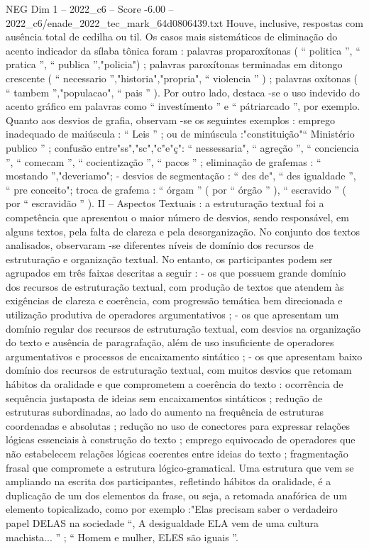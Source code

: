 \begin{textsample}{NEG Dim 1 – 2022\_c6 – Score -6.00 – 2022\_c6/enade\_2022\_tec\_mark\_64d0806439.txt}
Houve, inclusive, respostas com ausência total de cedilha ou til.
Os casos mais sistemáticos de eliminação do acento indicador da sílaba tônica foram : palavras proparoxítonas ( “ politica ”, “ pratica ”, “ publica ”,"policia") ; palavras paroxítonas terminadas em ditongo crescente ( “ necessario ”,"historia","propria", “ violencia ” ) ; palavras oxítonas ( “ tambem ”,"populacao", “ pais ” ).
Por outro lado, destaca -se o uso indevido do acento gráfico em palavras como “ investímento ” e “ pátriarcado ”, por exemplo.
Quanto aos desvios de grafia, observam -se os seguintes exemplos : emprego inadequado de maiúscula : “ Leis ” ; ou de minúscula :"constituição"“ Ministério publico ” ; confusão entre"ss","sc","c"e"ç": “ nessessaria", “ agreção ”, “ conciencia ”, “ comecam ”, “ cocientização ”, “ pacos ” ; eliminação de grafemas : “ mostando ”,"deveriamo"; - desvios de segmentação : “ des de", “ des igualdade ”, “ pre conceito"; troca de grafema : “ órgam ” ( por “ órgão ” ), “ escravido ” ( por “ escravidão ” ).
II – Aspectos Textuais : a estruturação textual foi a competência que apresentou o maior número de desvios, sendo responsável, em alguns textos, pela falta de clareza e pela desorganização.
No conjunto dos textos analisados, observaram -se diferentes níveis de domínio dos recursos de estruturação e organização textual.
No entanto, os participantes podem ser agrupados em três faixas descritas a seguir : - os que possuem grande domínio dos recursos de estruturação textual, com produção de textos que atendem às exigências de clareza e coerência, com progressão temática bem direcionada e utilização produtiva de operadores argumentativos ; - os que apresentam um domínio regular dos recursos de estruturação textual, com desvios na organização do texto e ausência de paragrafação, além de uso insuficiente de operadores argumentativos e processos de encaixamento sintático ; - os que apresentam baixo domínio dos recursos de estruturação textual, com muitos desvios que retomam hábitos da oralidade e que comprometem a coerência do texto : ocorrência de sequência justaposta de ideias sem encaixamentos sintáticos ; redução de estruturas subordinadas, ao lado do aumento na frequência de estruturas coordenadas e absolutas ; redução no uso de conectores para expressar relações lógicas essenciais à construção do texto ; emprego equivocado de operadores que não estabelecem relações lógicas coerentes entre ideias do texto ; fragmentação frasal que compromete a estrutura lógico-gramatical.
Uma estrutura que vem se ampliando na escrita dos participantes, refletindo hábitos da oralidade, é a duplicação de um dos elementos da frase, ou seja, a retomada anafórica de um elemento topicalizado, como por exemplo :"Elas precisam saber o verdadeiro papel DELAS na sociedade “, A desigualdade ELA vem de uma cultura machista... ” ; “ Homem e mulher, ELES são iguais ”.

\end{textsample}
